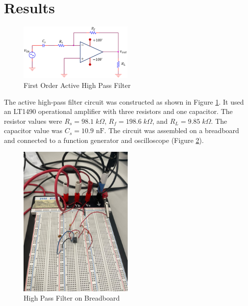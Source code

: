 \documentclass[12pt]{article}
\begin{document}
\section{Results}
\begin{figure}[H]
  \centering
  \includegraphics[width=0.5\textwidth]{photos/First Order Active High Pass Filter.png}
  \caption{First Order Active High Pass Filter}
  \label{fig:FirstOrderActiveHighPassFilter}
\end{figure}

The active high-pass filter circuit was constructed as shown in Figure \ref{fig:FirstOrderActiveHighPassFilter}.
It used an LT1490 operational amplifier with three resistors and one capacitor.
The resistor values were $R_s = 98.1 \; k\Omega$, $R_f = 198.6 \; k\Omega$, and $R_L = 9.85 \; k\Omega$.
The capacitor value was $C_s = 10.9 \text{ nF}$. The circuit was assembled on a breadboard
and connected to a function generator and oscilloscope (Figure \ref{fig:filteronbreadboard}).

\begin{figure}[H]
  \centering
  \includegraphics[width=0.5\textwidth]{photos/Circuit Photo 2.jpg}
  \caption{High Pass Filter on Breadboard}
  \label{fig:filteronbreadboard}
\end{figure}
\end{document}
